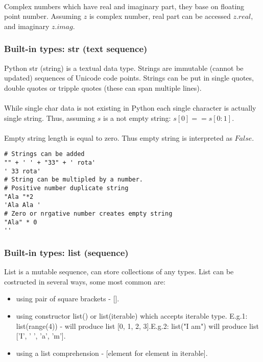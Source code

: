 \documentclass{article}
\begin{document}
	\paragraph{}
	Complex numbers which have real and imaginary part, they base on floating point number. Assuming $z$ is complex number, real part can be accessed $z.real$, and imaginary $z.imag$.
	\subsubsection{Built-in types: str (text sequence)}
	Python str (string) is a textual data type. Strings are immutable (cannot be updated) sequences of Unicode code points. Strings can be put in single quotes, double quotes or tripple quotes (these can span multiple lines).
	\paragraph{}
	While single char data is not existing in Python each single character is actually single string. Thus, assuming $s$ is a not empty string: $s[0] == s[0:1]$.
	\paragraph{}
	Empty string length is equal to zero. Thus empty string is interpreted as $False$.
	\begin{lstlisting}[style=pystyle]
# Strings can be added
"" + ' ' + "33" + ' rota'
' 33 rota'
# String can be multipled by a number.
# Positive number duplicate string
"Ala "*2
'Ala Ala '
# Zero or nrgative number creates empty string
"Ala" * 0
''
	\end{lstlisting}
	
	\subsubsection{Built-in types: list (sequence)}
	List is a mutable sequence, can store collections of any types. List can be costructed in several ways, some most common are:
	\begin{itemize}
	\item using pair of square brackets - [].
	\item \raggedright using constructor list() or list(iterable) which accepts iterable type. \linebreak E.g.1: list(range(4)) - will produce list [0, 1, 2, 3].\linebreak E.g.2: list("I am") will produce list ['I', ' ', 'a', 'm'].
	\item using a list comprehension - [element for element in iterable].
	\end{itemize}
\end{document}
